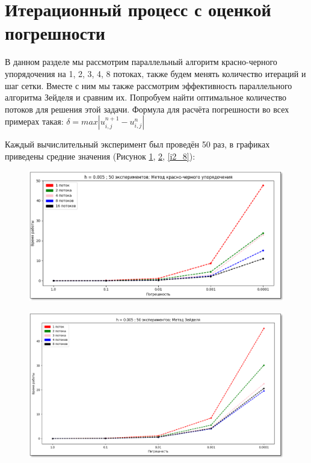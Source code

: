 \documentclass[a4paper, 14pt]{extreport}
\begin{document}
	\newpage
	\section{Итерационный процесс с оценкой погрешности}
	В данном разделе мы рассмотрим параллельный алгоритм красно-черного упорядочения на 1, 2, 3, 4, 8 потоках, также будем менять количество итераций и шаг сетки. Вместе с ним мы также рассмотрим эффективность параллельного алгоритма Зейделя и сравним их. Попробуем найти оптимальное количество потоков для решения этой задачи. Формула для расчёта погрешности во всех примерах такая:
$\delta = max|u_{i,j}^{n+1} - u_{i,j}^n|$
	
	Каждый вычислительный эксперимент был проведён 50 раз, в графиках приведены средние значения (Рисунок \ref{i2_6}, \ref{i2_7}, \ref{i2_8}):
	
	\newpage
	
	\begin{figure}[h]
		\begin{center}
			\includegraphics[width=0.7\linewidth]{ch2_1}
			\label{i2_6}
		\end{center}
	\end{figure}
	
	\begin{figure}[h]
		\begin{center}
			\includegraphics[width=0.7\linewidth]{ch2_2}
			\label{i2_7}
		\end{center}
	\end{figure}
\end{document}
